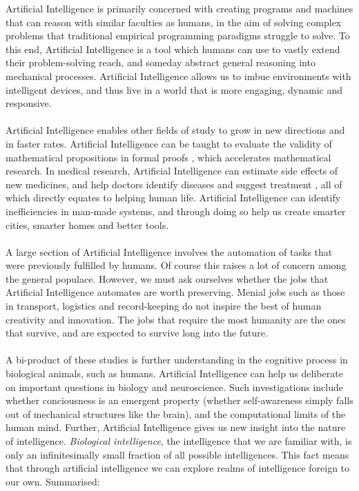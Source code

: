 \documentclass[10pt,a4paper]{article}
\begin{document}
				Artificial Intelligence is primarily concerned with creating programs
				and machines that can reason with similar faculties as humans, in the
				aim of solving complex problems that traditional empirical programming
				paradigms struggle to solve. To this end, Artificial Intelligence is a
				tool which humans can use to vastly extend their problem-solving reach,
				and someday abstract general reasoning into mechanical processes.
				Artificial Intelligence allows us to imbue environments with intelligent
				devices, and thus live in a world that is more engaging, dynamic and
				responsive. \\\\ Artificial Intelligence enables other fields of study
				to grow in new directions and in faster rates. Artificial Intelligence
				can be taught to evaluate the validity of mathematical propositions in
				formal proofs \cite{atp}, which accelerates mathematical research. In
				medical research, Artificial Intelligence can estimate side effects of
				new medicines, and help doctors identify diseases and suggest treatment
				\cite{cancer}, all of which directly equates to helping human life.
				Artificial Intelligence can identify inefficiencies in man-made systems,
				and through doing so help us create smarter cities, smarter homes and
				better tools. \\\\ A large section of Artificial Intelligence involves
				the automation of tasks that were previously fulfilled by humans. Of
				course this raises a lot of concern among the general populace. However,
				we must ask ourselves whether the jobs that Artificial Intelligence
				automates are worth preserving. Menial jobs such as those in transport,
				logistics and record-keeping do not inspire the best of human creativity
				and innovation. The jobs that require the most humanity are the ones
				that survive, and are expected to survive long into the future. \\\\ A
				bi-product of these studies is further understanding in the cognitive
				process in biological animals, such as humans. Artificial Intelligence
				can help us deliberate on important questions in biology and
				neuroscience. Such investigations include whether conciousness is an
				emergent property (whether self-awareness simply falls out of mechanical
				structures like the brain), and the computational limits of the human
				mind. Further, Artificial Intelligence gives us new insight into the
				nature of intelligence. \textsl{Biological intelligence}, the
				intelligence that we are familiar with, is only an infinitesimally small
				fraction of all possible intelligences. This fact means that through
				artificial intelligence we can explore realms of intelligence foreign to
				our own. Summarised:
\end{document}
